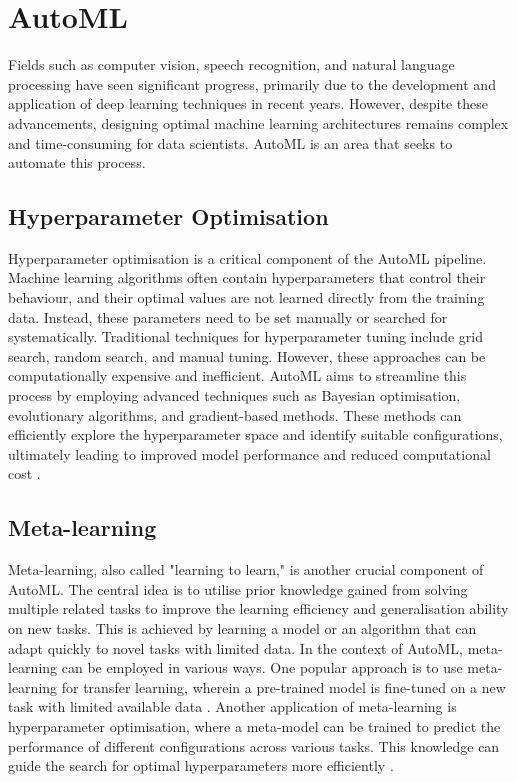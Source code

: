 \section{AutoML}\label{section:automl}

Fields such as computer vision, speech recognition, and natural language processing have seen significant progress, primarily due to the development and application of deep learning techniques in recent years. However, despite these advancements, designing optimal machine learning architectures remains complex and time-consuming for data scientists. \Gls{AutoML} is an area that seeks to automate this process.  

\subsection{Hyperparameter Optimisation}\label{subsection:hyperparameter-optimization}
Hyperparameter optimisation is a critical component of the \gls{AutoML} pipeline. Machine learning algorithms often contain hyperparameters that control their behaviour, and their optimal values are not learned directly from the training data. Instead, these parameters need to be set manually or searched for systematically. Traditional techniques for hyperparameter tuning include grid search, random search, and manual tuning. However, these approaches can be computationally expensive and inefficient.
\gls{AutoML} aims to streamline this process by employing advanced techniques such as Bayesian optimisation, evolutionary algorithms, and gradient-based methods. These methods can efficiently explore the hyperparameter space and identify suitable configurations, ultimately leading to improved model performance and reduced computational cost \autocite{bergstra2011algorithms, snoek2012practical}.

\subsection{Meta-learning}\label{subsection:meta-learning}
Meta-learning, also called "learning to learn," is another crucial component of \gls{AutoML}. The central idea is to utilise prior knowledge gained from solving multiple related tasks to improve the learning efficiency and generalisation ability on new tasks. This is achieved by learning a model or an algorithm that can adapt quickly to novel tasks with limited data.
In the context of \gls{AutoML}, meta-learning can be employed in various ways. One popular approach is to use meta-learning for transfer learning, wherein a pre-trained model is fine-tuned on a new task with limited available data \autocite{pan2010survey}. Another application of meta-learning is hyperparameter optimisation, where a meta-model can be trained to predict the performance of different configurations across various tasks. This knowledge can guide the search for optimal hyperparameters more efficiently \autocite{swersky2014freeze}.